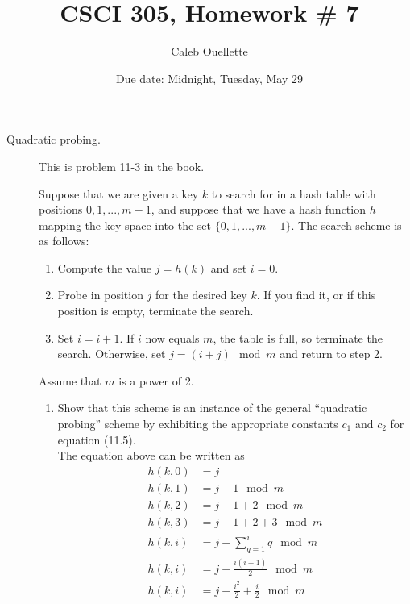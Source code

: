 \documentclass{article}
\title{CSCI 305, Homework \# 7}
\author{Caleb Ouellette}
\date{Due date:  Midnight, Tuesday, May 29}
\begin{document}
\maketitle

\begin{description}
\item[Quadratic probing.]  This is problem 11-3
  in the book.

  Suppose that we are given a key $k$ to search for in a hash table
  with positions $0,1,...,m-1$, and suppose that we have a hash
  function $h$ mapping the key space into the set $\{0,1,...,m-1\}$.
  The search scheme is as follows:

  \begin{enumerate}
  \item Compute the value $j=h(k)$ and set $i=0$.
    \item Probe in position $j$ for the desired key $k$.  If you find
      it, or if this position is empty, terminate the search.
      \item Set $i=i+1$.  If $i$ now equals $m$, the table is full, so
        terminate the search.  Otherwise, set $j=(i+j)\mod m$ and
        return to step 2.
  \end{enumerate}
  Assume that $m$ is a power of 2.
  \renewcommand{\theenumi}{\alph{enumi}}
  \begin{enumerate}
    \item Show that this scheme is an instance of the general
      ``quadratic probing'' scheme by exhibiting the appropriate
      constants $c_1$ and $c_2$ for equation (11.5). \\

      The equation above can be written as \\
      \begin{align*}
      h(k, 0) &= j\\
      h(k, 1) &= j + 1 \mod m\\
      h(k, 2) &= j + 1 + 2 \mod m\\
      h(k, 3) &= j + 1 + 2 + 3 \mod m\\
      h(k, i) &= j + \sum_{q=1}^i q  \mod m\\
      h(k, i) &= j + \frac{i(i + 1)}{2}  \mod m\\
      h(k, i) &= j + \frac{i^2}{2} + \frac{i}{2}  \mod m\\
      \end{align*}


\end{enumerate}
\end{description}
\end{document}
